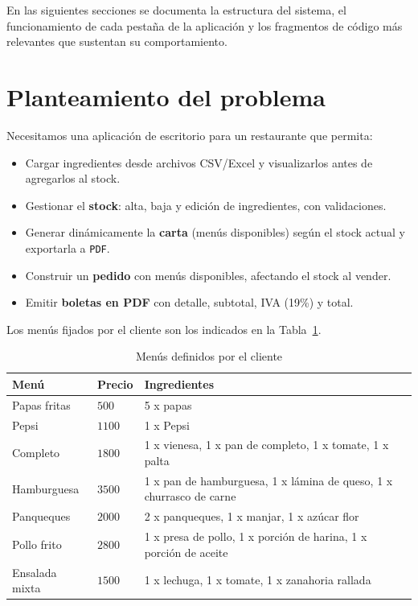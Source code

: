 \documentclass[12pt,a4paper]{article}
\begin{document}
En las siguientes secciones se documenta la estructura del sistema, el funcionamiento de cada pestaña de la aplicación y los fragmentos de código más relevantes que sustentan su comportamiento.

\newpage

\section{Planteamiento del problema}
Necesitamos una aplicación de escritorio para un restaurante que permita:
\begin{itemize}[leftmargin=*]
  \item Cargar ingredientes desde archivos CSV/Excel y visualizarlos antes de agregarlos al stock.
  \item Gestionar el \textbf{stock}: alta, baja y edición de ingredientes, con validaciones.
  \item Generar dinámicamente la \textbf{carta} (menús disponibles) según el stock actual y exportarla a \texttt{PDF}.
  \item Construir un \textbf{pedido} con menús disponibles, afectando el stock al vender.
  \item Emitir \textbf{boletas en PDF} con detalle, subtotal, IVA (19\%) y total.
\end{itemize}
Los menús fijados por el cliente son los indicados en la Tabla~\ref{tab:menus}.

\begin{table}[H]
  \centering
  \caption{Menús definidos por el cliente}\label{tab:menus}
  \begin{tabular}{@{} l l p{8cm} @{}}
    \toprule
    \textbf{Menú} & \textbf{Precio} & \textbf{Ingredientes} \\
    \midrule
    Papas fritas & $500$ & 5 x papas \\
    Pepsi & $1100$ & 1 x Pepsi \\
    Completo & $1800$ & 1 x vienesa, 1 x pan de completo, 1 x tomate, 1 x palta \\
    Hamburguesa & $3500$ & 1 x pan de hamburguesa, 1 x lámina de queso, 1 x churrasco de carne \\
    Panqueques & $2000$ & 2 x panqueques, 1 x manjar, 1 x azúcar flor \\
    Pollo frito & $2800$ & 1 x presa de pollo, 1 x porción de harina, 1 x porción de aceite \\
    Ensalada mixta & $1500$ & 1 x lechuga, 1 x tomate, 1 x zanahoria rallada \\
    \bottomrule
  \end{tabular}
\end{table}
\end{document}
